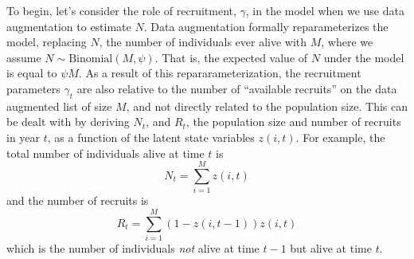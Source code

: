 To begin, let's consider the role of recruitment, $\gamma$, in the
model when we use data augmentation to estimate $N$.
Data augmentation formally reparameterizes the model, replacing $N$,
the number of individuals ever alive with $M$, where we
assume $N \sim \mbox {Binomial}(M, \psi)$.  
That is, the expected value of $N$ under the model is equal to
$\psi M$.  As a result of this repararameterization, the recruitment
parameters $\gamma_{t}$ are also relative to the number of ``available
recruits'' on the data augmented list of size $M$, and not directly
related to the population size.  This can be dealt with
by deriving
$N_t$, and $R_{t}$, the population size and number of recruits in year
$t$, as a function of the latent state variables $z(i,t)$.  For
example, 
 the total number of individuals alive at time $t$ is
\[
N_{t} = \sum_{i=1}^{M} z(i,t)
\]
and the number of recruits is
\[
R_{t} = \sum_{i=1}^{M} (1-z(i,t-1))z(i,t)
\]
which is the number of individuals {\it not} alive at time $t-1$ but
alive at time $t$.

